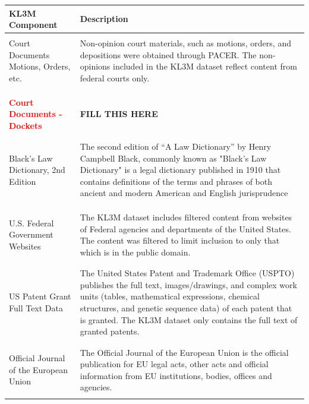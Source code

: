 \begin{table}[!ht]
\scriptsize
\begin{longtable}{ p{3cm} p{9cm} }
\textbf{KL3M Component}
& \textbf{Description}
\\\midrule
\\
Court Documents Motions, Orders, etc. & Non-opinion court materials, such as motions, orders, and depositions were obtained through PACER. The non-opinions included in the KL3M dataset reflect content from federal courts only.   \\\\
 \\\hline
 \\
\textcolor{red}{\textbf{Court Documents - Dockets}}
&
\textcolor{black}{}\textbf{FILL THIS HERE}

\\
 \\\hline
  \\
Black's Law Dictionary, 2nd Edition &
The second edition of ``A Law Dictionary'' by Henry Campbell Black, commonly known as "Black's Law Dictionary" is a legal dictionary published in 1910 that contains definitions of the terms and phrases of both ancient and modern American and English jurisprudence \\\\
 \\\hline  \\
U.S. Federal Government Websites &
The KL3M dataset includes filtered content from websites of Federal agencies and departments of the United States. The content was filtered to limit inclusion to only that which is in the public domain.  \\
 \\\hline
 \\
US Patent Grant Full Text Data &
The United States Patent and Trademark Office (USPTO) publishes the full text, images/drawings, and complex work units (tables, mathematical expressions, chemical structures, and genetic sequence data) of each patent that is granted. The KL3M dataset only contains the full text of granted patents.
  \\
 \\\hline
 \\
 Official Journal of the European Union &
The Official Journal of the European Union is the official publication for EU legal acts, other acts and official information from EU institutions, bodies, offices and agencies. \\
 \\\hline
    \end{longtable}

\end{table}
